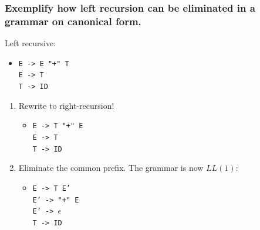 \documentclass[11pt]{beamer}
\begin{document}
\begin{frame}
\frametitle{Exemplify how \textbf{left recursion} can be eliminated in a grammar on \textbf{canonical form}.}

Left recursive:
\begin{itemize}
\item
\texttt{E -> E "+" T }\\
\texttt{E -> T}\\
\texttt{T -> ID}
\end{itemize}
\begin{enumerate}
\item Rewrite to right-recursion!
\begin{itemize}
\item 
\texttt{E -> T "+" E}\\
\texttt{E -> T}\\
\texttt{T -> ID}

\end{itemize}
\item Eliminate the common prefix. The grammar is now $LL(1)$:
\begin{itemize}
\item
\texttt{E -> T E' }\\
\texttt{E' -> "+" E }\\
\texttt{E' -> $\epsilon$}\\
\texttt{T -> ID}
\end{itemize}
\end{enumerate}


\end{frame}
\end{document}
